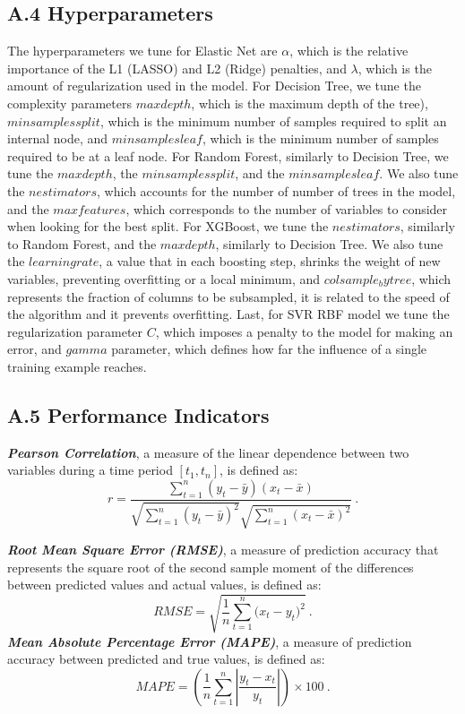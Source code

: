 \documentclass{bmcart}
\begin{document}
\subsection*{\textbf{A.4 Hyperparameters}}
\label{appendix4}

The hyperparameters we tune for Elastic Net are $\alpha$, which is the relative importance of the L1 (LASSO) and L2 (Ridge) penalties, and $\lambda$, which is the amount of regularization used in the model. 
For Decision Tree, we tune the complexity parameters $max depth$, which is the maximum depth of the tree), $min samples split$, which is the minimum number of samples required to split an internal node, and $min samples leaf$, which is the minimum number of samples required to be at a leaf node. 
For Random Forest, similarly to Decision Tree, we tune the $max depth$, the $min samples split$, and the $min samples leaf$. We also tune the $n estimators$, which accounts for the number of number of trees in the model, and the $max features$, which corresponds to the number of variables to consider when looking for the best split. For XGBoost, we tune the $n estimators$, similarly to Random Forest, and the $max depth$, similarly to Decision Tree. We also tune the $learning rate$, a value that in each boosting step, shrinks the weight of new variables, preventing overfitting or a local minimum, and $colsample_bytree$, which represents the fraction of columns to be subsampled, it is related to the speed of the algorithm and it prevents overfitting. Last, for SVR RBF model we tune the regularization parameter $C$, which imposes a penalty to the model for making an error, and $gamma$ parameter, which defines how far the influence of a single training example reaches.


\subsection*{\textbf{A.5 Performance Indicators}}
\label{appendix5}

\textit{\textbf{Pearson Correlation}}, a measure of the linear dependence between two variables during a time period $[t_1, t_n]$, is defined as:
\begin{equation}
r = \frac{\sum_{t=1}^n (y_t - \bar{y}) (x_t - \bar{x})}{\sqrt{\sum_{t=1}^n (y_t - \bar{y})^2} \sqrt{\sum_{t=1}^n (x_t - \bar{x})^2}}~.
\end{equation}

\textit{\textbf{Root Mean Square Error (RMSE)}}, a measure of prediction accuracy that represents the square root of the second sample moment of the differences between predicted values and actual values, is defined as:
\begin{equation}
\mathit{RMSE} = \sqrt{\frac{1}{n}\sum_{t=1}^n{(x_t - y_t})^2}~.
\end{equation}
\textit{\textbf{Mean Absolute Percentage Error (MAPE)}}, a measure of prediction accuracy between predicted and true values, is defined as:
\begin{equation}
\mathit{MAPE} = (\frac{1}{n}\sum_{t=1}^n{ |\frac{y_t - x_t}{y_t}|}) \times 100~.
\end{equation}
\end{document}
